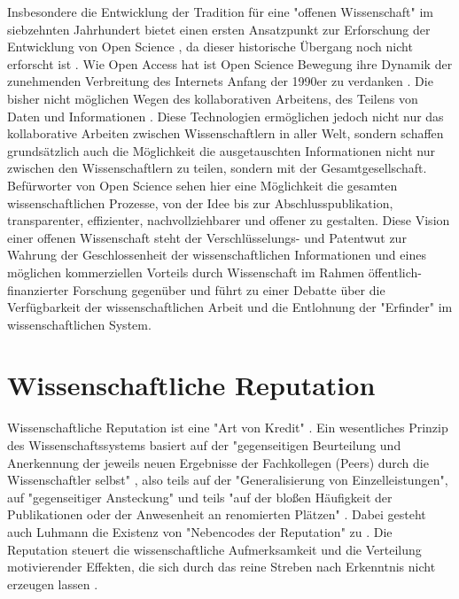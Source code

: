 Insbesondere die Entwicklung der Tradition für eine "offenen Wissenschaft" im siebzehnten Jahrhundert bietet einen ersten Ansatzpunkt zur Erforschung der Entwicklung von Open Science \cite{Scheliga_2014}, da dieser historische Übergang noch nicht erforscht ist \cite{CREATe_2014}. Wie Open Access hat ist Open Science Bewegung ihre Dynamik der zunehmenden Verbreitung des Internets Anfang der 1990er zu verdanken \cite{Lievrouw_2010}. Die bisher nicht möglichen Wegen des kollaborativen Arbeitens, des Teilens von Daten und Informationen \cite{Meyer_2013}. Diese Technologien ermöglichen jedoch nicht nur das kollaborative Arbeiten zwischen Wissenschaftlern in aller Welt, sondern schaffen grundsätzlich auch die Möglichkeit die ausgetauschten Informationen nicht nur zwischen den Wissenschaftlern zu teilen, sondern mit der Gesamtgesellschaft. Befürworter von Open Science sehen hier eine Möglichkeit die gesamten wissenschaftlichen Prozesse, von der Idee bis zur Abschlusspublikation, transparenter, effizienter, nachvollziehbarer und offener zu gestalten. Diese Vision einer offenen Wissenschaft steht der Verschlüsselungs- und Patentwut zur Wahrung der Geschlossenheit der wissenschaftlichen Informationen und eines möglichen kommerziellen Vorteils durch Wissenschaft im Rahmen öffentlich-finanzierter Forschung gegenüber und führt zu einer Debatte über die Verfügbarkeit der wissenschaftlichen Arbeit und die Entlohnung der "Erfinder" im wissenschaftlichen System.

\section{Wissenschaftliche Reputation}

Wissenschaftliche Reputation ist eine "Art von Kredit" \cite{luhmann_1970_selbststeuerung}. Ein wesentliches Prinzip des Wissenschaftssystems basiert auf der "gegenseitigen Beurteilung und Anerkennung der jeweils neuen Ergebnisse der Fachkollegen (Peers) durch die Wissenschaftler selbst"\cite{Hanekop_2014} \cite{suchen_Hornbostel_2006}, also teils auf der "Generalisierung von Einzelleistungen", auf "gegenseitiger Ansteckung" und teils "auf der bloßen Häufigkeit der Publikationen oder der Anwesenheit an renomierten Plätzen" \cite{luhmann_1970_selbststeuerung}. Dabei gesteht auch Luhmann die Existenz von "Nebencodes der Reputation" zu \cite{schmoch_2003_hochschulforschung}. Die Reputation steuert die wissenschaftliche Aufmerksamkeit und die Verteilung motivierender Effekten, die sich durch das reine Streben nach Erkenntnis nicht erzeugen lassen \cite{suchen_luhmann}.

